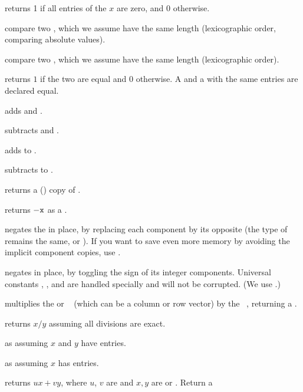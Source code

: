 returns 1 if all entries of the  $x$ are
zero, and $0$ otherwise.

 compare two , which we assume have
the same length (lexicographic order, comparing absolute values).

 compare two , which we assume have
the same length (lexicographic order).

 returns $1$ if the two  are equal
and $0$ otherwise. A  and a  with the same entries are
declared equal.

 adds  and .

 subtracts  and .

 adds  to .

 subtracts  to .

 returns a () copy of .

 returns $-{\tt x}$ as a .

 negates the   in place, by
replacing each component by its opposite (the type of  remains the
same,  or ). If you want to save even more memory by
avoiding the implicit component copies, use .

 negates  in place, by toggling the
sign of its integer components. Universal constants ,
,  and  are handled specially and will
not be corrupted. (We use .)

 multiplies the  or ~
(which can be a column or row vector) by the ~, returning a
.

 returns $x/y$ assuming all divisions
are exact.

 as  assuming $x$
and $y$ have  entries.

 as  assuming $x$
has  entries.

 returns $ux + vy$, where
$u$, $v$ are  and $x,y$ are  or . Return a 

